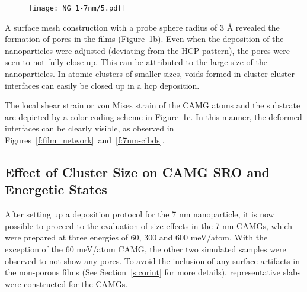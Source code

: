 \begin{figure}[!h] \centering
	\texttt{[image: NG\_1-7nm/5.pdf]}
	\label{f:7nm-cibdpores}
\end{figure}

A surface mesh construction \cite{Stukowski2010a,Stukowski2014} with a probe sphere radius of 3 \r{A} revealed the formation of pores in the films (Figure~\ref{f:7nm-cibdpores}b). Even when the deposition of the nanoparticles were adjusted (deviating from the HCP pattern), the pores were seen to not fully close up. This can be attributed to the large size of the nanoparticles. In atomic clusters of smaller sizes, voids formed in cluster-cluster interfaces can easily be closed up in a \gls{hcp} deposition. \par

The local shear strain or von Mises strain of the CAMG atoms and the substrate are depicted by a color coding scheme in Figure~\ref{f:7nm-cibdpores}c. In this manner, the deformed interfaces can be clearly visible, as observed in Figures~\ref{f:film_network}~and~\ref{f:7nm-cibds}. \par

\subsection{Effect of Cluster Size on CAMG SRO and Energetic States}
After setting up a deposition protocol for the 7 nm nanoparticle, it is now possible to proceed to the evaluation of size effects in the 7 nm CAMGs, which were prepared at three energies of 60, 300 and 600 meV/atom. With the exception of the 60 meV/atom CAMG, the other two simulated samples were observed to not show any pores. To avoid the inclusion of any surface artifacts in the non-porous films (See Section~\ref{s:corint} for more details), representative slabs were constructed for the CAMGs. \par

